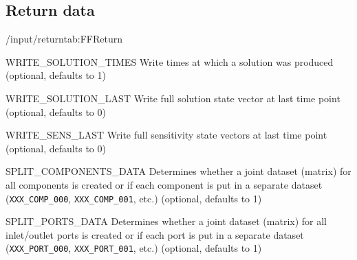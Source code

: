 \subsection{Return data}

\begin{groupscope}{/input/return}{tab:FFReturn}
  \begin{dataset}[type = int, range={$\{0,1\}$}]{WRITE\_SOLUTION\_TIMES}
    Write times at which a solution was produced (optional, defaults to 1)
  \end{dataset}
  \begin{dataset}[type = int, range={$\{0,1\}$}]{WRITE\_SOLUTION\_LAST}
    Write full solution state vector at last time point (optional, defaults to 0)
  \end{dataset}
  \begin{dataset}[type = int, range={$\{0,1\}$}]{WRITE\_SENS\_LAST}
    Write full sensitivity state vectors at last time point (optional, defaults to 0)
  \end{dataset}
  \begin{dataset}[type = int, range={$\{0,1\}$}]{SPLIT\_COMPONENTS\_DATA}
    Determines whether a joint dataset (matrix) for all components is created or if each component is put in a separate dataset (\texttt{XXX\_COMP\_000}, \texttt{XXX\_COMP\_001}, etc.) (optional, defaults to 1)
  \end{dataset}
  \begin{dataset}[type = int, range={$\{0,1\}$}]{SPLIT\_PORTS\_DATA}
    Determines whether a joint dataset (matrix) for all inlet/outlet ports is created or if each port is put in a separate dataset (\texttt{XXX\_PORT\_000}, \texttt{XXX\_PORT\_001}, etc.) (optional, defaults to 1)
  \end{dataset}
\end{groupscope}

